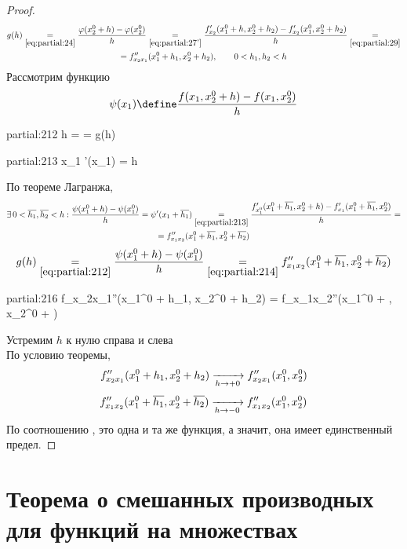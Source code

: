 \begin{proof}
\begin{multline}
		g(h) \underset{\eref{partial:24}}= \frac{\vphi(x_2^0 + h) - \vphi(x_2^0)}h \underset{\eref{partial:27'}}= \frac{f_{x_2}'(x_1^0 + h, x_2^0 + h_2) - f_{x_2}'(x_1^0, x_2^0 + h_2)}h \underset{\eref{partial:29}}= \\
		= f_{x_2x_1}''(x_1^0 + h_1, x_2^0 + h_2), \qquad 0 < h_1, h_2 < h
	\end{multline}
	Рассмотрим функцию
	$$ \psi(x_1) \define \frac{f(x_1, x_2^0 + h) - f(x_1, x_2^0)}h $$
	\begin{equ}{partial:212}
		h =  = g(h)
	\end{equ}
	\begin{equ}{partial:213}
		\forall x_1 \in [x_1^0, x_1^0 + h] \quad \exist \psi'(x_1) = h
	\end{equ}
	По теореме Лагранжа,
	\begin{multline}\lbl{partial:214}
		\exist 0 < \overline{h_1}, \overline{h_2} < h : \frac{\psi(x_1^0 + h) - \psi(x_1^0)}h = \psi'(x_1 + \overline{h_1}) \underset{\eref{partial:213}}= \frac{f_{x_1^0}'(x_1^0 + \overline{h_1}, x_2^0 + h) - f_{x_1}'(x_1^0 + \overline{h_1}, x_2^0)}h = \\
		= f_{x_1x_2}''(x_1^0 + \overline{h_1}, x_2^0 + \overline{h_2})
	\end{multline}
	$$ g(h) \underset{\eref{partial:212}}= \frac{\psi(x_1^0 + h) - \psi(x_1^0)}h \underset{\eref{partial:214}}= f_{x_1x_2}''(x_1^0 + \overline{h_1}, x_2^0 + \overline{h_2}) $$
	\begin{equ}{partial:216}
		 f_{x_2x_1}''(x_1^0 + h_1, x_2^0 + h_2) = f_{x_1x_2}''(x_1^0 + , x_2^0 + )
	\end{equ}
	Устремим $ h $ к нулю справа и слева \\
	По условию теоремы,
	$$ f_{x_2x_1}''(x_1^0 + h_1, x_2^0 + h_2) \xrightarrow[h \to +0]{} f_{x_2x_1}''(x_1^0, x_2^0) $$
	$$ f_{x_1x_2}''(x_1^0 + \overline{h_1}, x_2^0 + \overline{h_2}) \xrightarrow[h \to -0]{} f_{x_1x_2}''(x_1^0, x_2^0) $$
	По соотношению , это одна и та же функция, а значит, она имеет единственный предел.
\end{proof}

\section{Теорема о смешанных производных для функций на множествах }

